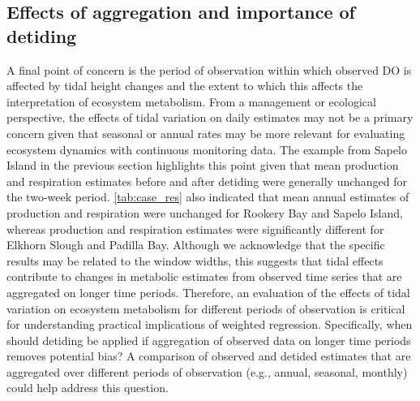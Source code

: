 \documentclass[letterpaper,12pt,oneside]{article}\usepackage[]{graphicx}\usepackage[]{color}
\begin{document}
\subsection{Effects of aggregation and importance of detiding}

A final point of concern is the period of observation within which observed \ac{DO} is affected by tidal height changes and the extent to which this affects the interpretation of ecosystem metabolism.  From a management or ecological perspective, the effects of tidal variation on daily estimates may not be a primary concern given that seasonal or annual rates may be more relevant for evaluating ecosystem dynamics with continuous monitoring data.  The example from Sapelo Island in the previous section highlights this point given that mean production and respiration estimates before and after detiding were generally unchanged for the two-week period. \cref{tab:case_res} also indicated that mean annual estimates of production and respiration were unchanged for Rookery Bay and Sapelo Island, whereas production and respiration estimates were significantly different for Elkhorn Slough and Padilla Bay. Although we acknowledge that the specific results may be related to the window widths, this suggests that tidal effects contribute to changes in metabolic estimates from observed time series that are aggregated on longer time periods.  Therefore, an evaluation of the effects of tidal variation on ecosystem metabolism for different periods of observation is critical for understanding practical implications of weighted regression.  Specifically, when should detiding be applied if aggregation of observed data on longer time periods removes potential bias?  A comparison of observed and detided estimates that are aggregated over different periods of observation (e.g., annual, seasonal, monthly) could help address this question.
\end{document}
